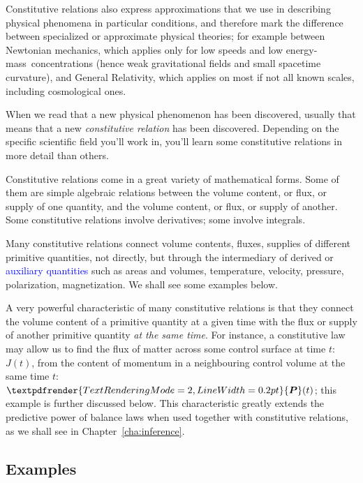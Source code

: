 \documentclass[a4paper,12pt,%
onecolumn,oneside,%
british%
]{memoir}
\renewcommand*{\bm}[1]{\textpdfrender{TextRenderingMode=2,LineWidth=0.2pt}{\boldsymbol{#1}}}
\renewcommand*{\|}[1][]{\nonscript\:#1\vert\nonscript\:\mathopen{}}
\newcommand*{\sect}{\S}%
\newcommand*{\chap}{Chapter}%
\renewcommand*{\autoref}[2]{\sidepar{\vspace{-1ex}\footnotesize{\color{blue}\faIcon{%
angle-right%
}\enskip\sect~\ref{#1} page~\pageref{#1}}}\textcolor{blue}{#2}}
\newcommand*{\energym}{energy-mass}
\newcommand*{\yJ}{J}
\newcommand*{\yP}{\bm{P}}
\begin{document}
Constitutive relations also express approximations that we use in describing physical phenomena in particular conditions, and therefore mark the difference between specialized or approximate physical theories; for example between Newtonian mechanics, which applies only for low speeds and low \energym\ concentrations (hence weak gravitational fields and small spacetime curvature), and General Relativity, which applies on most if not all known scales, including cosmological ones.

When we read that a new physical phenomenon has been discovered, usually that means that a new \emph{constitutive relation} has been discovered. Depending on the specific scientific field you'll work in, you'll learn some constitutive relations in more detail than others.

\medskip

Constitutive relations come in a great variety of mathematical forms. Some of them are simple algebraic relations between the volume content, or flux, or supply of one quantity, and the volume content, or flux, or supply of another. Some constitutive relations involve derivatives; some involve integrals.

Many constitutive relations connect volume contents, fluxes, supplies of different primitive quantities, not directly, but through the intermediary of derived or \autoref{sec:aux_quantities}{auxiliary quantities} such as areas and volumes, temperature, velocity, pressure, polarization, magnetization. We shall see some examples below.

\medskip

A very powerful characteristic of many constitutive relations is that they connect the volume content of a primitive quantity at a given time with the flux or supply of another primitive quantity \emph{at the same time}. For instance, a constitutive law may allow us to find the flux of matter across some control surface at time $t$: $\yJ(t)$, from the content of momentum in a neighbouring control volume at the same time $t$: $\yP(t)$; this example is further discussed below. This characteristic greatly extends the predictive power of balance laws when used together with constitutive relations, as we shall see in \chap~\ref{cha:inference}.



\subsection{Examples}
\label{sec:example_constitutive}
\end{document}
